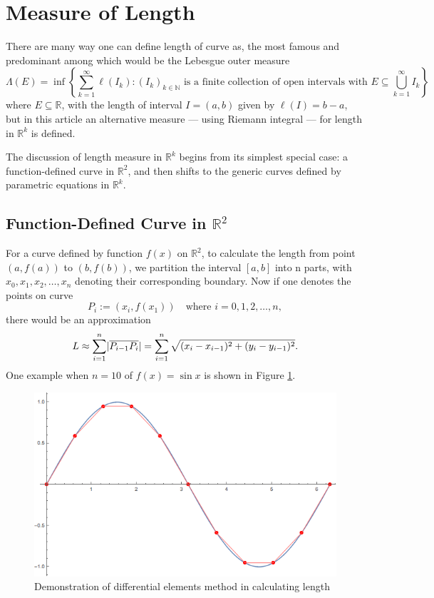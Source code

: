 \documentclass[12pt,a4paper]{article}
\DeclarePairedDelimiter\abs{\lvert}{\rvert}
\begin{document}
\section{Measure of Length}
There are many way one can define length of curve as, the most famous and predominant among which would be the Lebesgue outer measure \cite{lebesgue_outer_measure}
\[
\Lambda(E) = \operatorname{inf} \left\{\sum_{k=1}^\infty \ell(I_k) : {(I_k)_{k \in \mathbb N}} \text{ is a finite collection of open intervals with } E\subseteq \bigcup_{k=1}^\infty I_k\right\}
\]
where $E\subseteq\mathbb{R}$, with the length of interval $I = (a, b)$ given by $\ell(I)= b - a$, but in this article an alternative measure --- using Riemann integral \cite{riemann_sum_integral} --- for length in $\mathbb{R}^k$ is defined.

The discussion of length measure in $\mathbb{R}^k$ begins from its simplest special case: a function-defined curve in $\mathbb{R}^2$, and then shifts to the generic curves defined by parametric equations in $\mathbb{R}^k$.

\subsection{Function-Defined Curve in $\mathbb{R}^2$}
For a curve defined by function $f(x)$ on $\mathbb{R}^2$, to calculate the length from point $(a,f(a))$ to $(b,f(b))$, we partition the interval $[a,b]$ into n parts, with $x_0,x_1,x_2,\dots,x_n$ denoting their corresponding boundary. Now if one denotes the points on curve \[P_i:=(x_i,f(x_1))\quad\text{where }i=0,1,2,\dots,n,\] there would be an approximation \begin{gather}\label{eqn:length_approx}L\approx\sum_{i=1}^n\abs{\overline{P_{i-1}P_i}}=\sum_{i=1}^n\sqrt{(x_i-x_{i-1})^2+(y_i-y_{i-1})^2}.\end{gather} One example when $n=10$ of $f(x)=\sin x$ is shown in Figure \ref{fig:differential_element_length}.

\begin{figure}[htbp]
    \centering
    \includegraphics[scale=0.7]{differential_element_length.png}
    \caption{Demonstration of differential elements method in calculating length}
    \label{fig:differential_element_length}
\end{figure}
\end{document}
